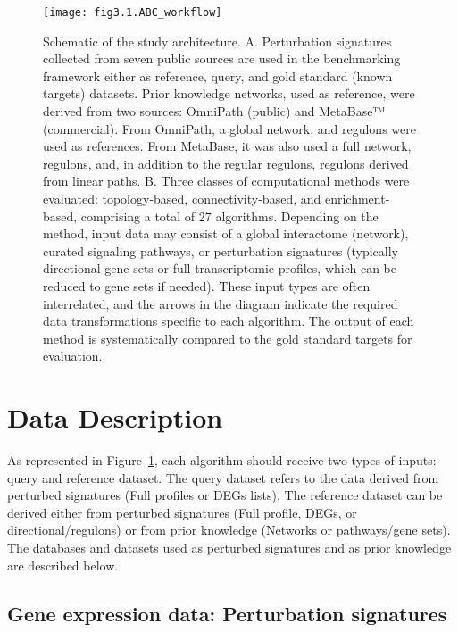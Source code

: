 \begin{figure}[htbp]
    \centering
    \texttt{[image: fig3.1.ABC\_workflow]}
    \caption{Schematic of the study architecture. A. Perturbation signatures collected from seven public sources are used in the benchmarking framework either as reference, query, and gold standard (known targets) datasets. Prior knowledge networks, used as reference, were derived from two sources: OmniPath (public) and MetaBase™ (commercial). From OmniPath, a global network, and regulons were used as references. From MetaBase, it was also used a full network, regulons, and, in addition to the regular regulons, regulons derived from linear paths. B. Three classes of computational methods were evaluated: topology-based, connectivity-based, and enrichment-based, comprising a total of 27 algorithms. Depending on the method, input data may consist of a global interactome (network), curated signaling pathways, or perturbation signatures (typically directional gene sets or full transcriptomic profiles, which can be reduced to gene sets if needed). These input types are often interrelated, and the arrows in the diagram indicate the required data transformations specific to each algorithm. The output of each method is systematically compared to the gold standard targets for evaluation.}
    \label{fig:fig3.1.ABC_workflow}
\end{figure}


\section{Data Description} %
\label{sec:data_description}

As represented in Figure~\ref{fig:fig3.1.ABC_workflow}, each algorithm should receive two types of inputs: query and reference dataset. The query dataset refers to the data derived from perturbed signatures (Full profiles or DEGs lists). The reference dataset can be derived either from perturbed signatures (Full profile, DEGs, or directional/regulons) or from prior knowledge (Networks or pathways/gene sets). The databases and datasets used as perturbed signatures and as prior knowledge are described below.

\subsection{Gene expression data: Perturbation signatures}
\label{sub:gene_expression_data_perturbation_signatures}

